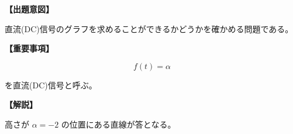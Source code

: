 \noindent \textbf{【出題意図】}

\noindent 直流(DC)信号のグラフを求めることができるかどうかを確かめる問題である。

\vspace{1em}
\noindent \textbf{【重要事項】}

\[
f(t) = \alpha
\]

\medskip
\noindent を直流(DC)信号と呼ぶ。


\vspace{1em}
\noindent \textbf{【解説】}

\noindent 高さが $\alpha = -2$ の位置にある直線が答となる。
